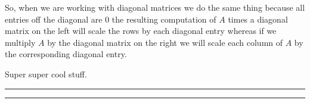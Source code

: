 \documentclass{article}
\begin{document}
So, when we are working with diagonal matrices we do the same thing because all entries off the diagonal are 0 the resulting computation of $A$ times a diagonal matrix on the left will scale the rows by each diagonal entry whereas if we multiply $A$ by the diagonal matrix on the right we will scale each column of $A$ by the corresponding diagonal entry. 

Super super cool stuff.\\

\hrule\vspace{2pt}
\hrule
\break 
\end{document}
